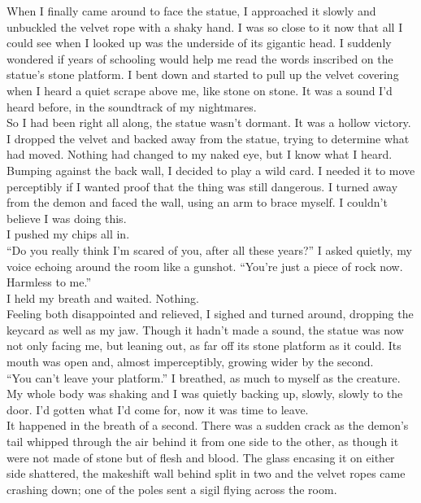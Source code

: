 \documentclass[a5paper]{scrartcl}
\begin{document}
When I finally came around to face the statue, I approached it slowly and unbuckled the velvet rope with a shaky hand. I was so close to it now that all I could see when I looked up was the underside of its gigantic head. I suddenly wondered if years of schooling would help me read the words inscribed on the statue's stone platform. I bent down and started to pull up the velvet covering when I heard a quiet scrape above me, like stone on stone. It was a sound I'd heard before, in the soundtrack of my nightmares.\\


So I had been right all along, the statue wasn't dormant. It was a hollow victory. I dropped the velvet and backed away from the statue, trying to determine what had moved. Nothing had changed to my naked eye, but I know what I heard.\\


Bumping against the back wall, I decided to play a wild card. I needed it to move perceptibly if I wanted proof that the thing was still dangerous. I turned away from the demon and faced the wall, using an arm to brace myself. I couldn't believe I was doing this.\\


I pushed my chips all in. \\


\enquote{Do you really think I'm scared of you, after all these years?} I asked quietly, my voice echoing around the room like a gunshot. \enquote{You're just a piece of rock now. Harmless to me.} \\


I held my breath and waited. Nothing.\\


Feeling both disappointed and relieved, I sighed and turned around, dropping the keycard as well as my jaw. Though it hadn't made a sound, the statue was now not only facing me, but leaning out, as far off its stone platform as it could. Its mouth was open and, almost imperceptibly, growing wider by the second. \\


\enquote{You can't leave your platform.} I breathed, as much to myself as the creature. My whole body was shaking and I was quietly backing up, slowly, slowly to the door. I'd gotten what I'd come for, now it was time to leave.\\


It happened in the breath of a second. There was a sudden crack as the demon's tail whipped through the air behind it from one side to the other, as though it were not made of stone but of flesh and blood. The glass encasing it on either side shattered, the makeshift wall behind split in two and the velvet ropes came crashing down; one of the poles sent a sigil flying across the room. \\
\end{document}
